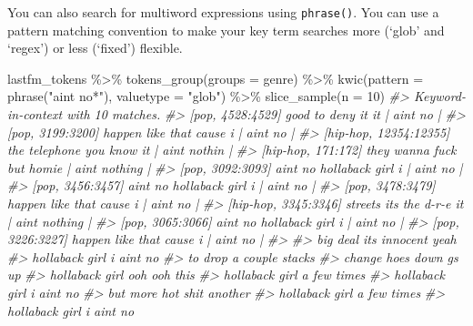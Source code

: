 \documentclass[
]{article}
\newenvironment{Shaded}{\begin{snugshade}}{\end{snugshade}}
\newcommand{\AttributeTok}[1]{\textcolor[rgb]{0.77,0.63,0.00}{#1}}
\newcommand{\CommentTok}[1]{\textcolor[rgb]{0.56,0.35,0.01}{\textit{#1}}}
\newcommand{\DecValTok}[1]{\textcolor[rgb]{0.00,0.00,0.81}{#1}}
\newcommand{\FunctionTok}[1]{\textcolor[rgb]{0.00,0.00,0.00}{#1}}
\newcommand{\NormalTok}[1]{#1}
\newcommand{\SpecialCharTok}[1]{\textcolor[rgb]{0.00,0.00,0.00}{#1}}
\newcommand{\StringTok}[1]{\textcolor[rgb]{0.31,0.60,0.02}{#1}}
\begin{document}
You can also search for multiword expressions using \texttt{phrase()}. You can use a pattern matching convention to make your key term searches more (`glob' and `regex') or less (`fixed') flexible.

\begin{Shaded}
\begin{Highlighting}[]
\NormalTok{lastfm\_tokens }\SpecialCharTok{\%\textgreater{}\%}
    \FunctionTok{tokens\_group}\NormalTok{(}\AttributeTok{groups =}\NormalTok{ genre) }\SpecialCharTok{\%\textgreater{}\%}
    \FunctionTok{kwic}\NormalTok{(}\AttributeTok{pattern =} \FunctionTok{phrase}\NormalTok{(}\StringTok{"ain\textquotesingle{}t no*"}\NormalTok{), }\AttributeTok{valuetype =} \StringTok{"glob"}\NormalTok{) }\SpecialCharTok{\%\textgreater{}\%}
    \FunctionTok{slice\_sample}\NormalTok{(}\AttributeTok{n =} \DecValTok{10}\NormalTok{)}
\CommentTok{\#\textgreater{} Keyword{-}in{-}context with 10 matches.                                                                   }
\CommentTok{\#\textgreater{}        [pop, 4528:4529]        good to deny it it |   ain\textquotesingle{}t no    |}
\CommentTok{\#\textgreater{}        [pop, 3199:3200]  happen like that cause i |   ain\textquotesingle{}t no    |}
\CommentTok{\#\textgreater{}  [hip{-}hop, 12354:12355] the telephone you know it | ain\textquotesingle{}t nothin  |}
\CommentTok{\#\textgreater{}      [hip{-}hop, 171:172] they wanna fuck but homie | ain\textquotesingle{}t nothing |}
\CommentTok{\#\textgreater{}        [pop, 3092:3093] ain\textquotesingle{}t no hollaback girl i |   ain\textquotesingle{}t no    |}
\CommentTok{\#\textgreater{}        [pop, 3456:3457] ain\textquotesingle{}t no hollaback girl i |   ain\textquotesingle{}t no    |}
\CommentTok{\#\textgreater{}        [pop, 3478:3479]  happen like that cause i |   ain\textquotesingle{}t no    |}
\CommentTok{\#\textgreater{}    [hip{-}hop, 3345:3346] streets it\textquotesingle{}s the d{-}r{-}e it | ain\textquotesingle{}t nothing |}
\CommentTok{\#\textgreater{}        [pop, 3065:3066] ain\textquotesingle{}t no hollaback girl i |   ain\textquotesingle{}t no    |}
\CommentTok{\#\textgreater{}        [pop, 3226:3227]  happen like that cause i |   ain\textquotesingle{}t no    |}
\CommentTok{\#\textgreater{}                             }
\CommentTok{\#\textgreater{}  big deal it\textquotesingle{}s innocent yeah}
\CommentTok{\#\textgreater{}  hollaback girl i ain\textquotesingle{}t no  }
\CommentTok{\#\textgreater{}  to drop a couple stacks    }
\CommentTok{\#\textgreater{}  change hoes down g\textquotesingle{}s up    }
\CommentTok{\#\textgreater{}  hollaback girl ooh ooh this}
\CommentTok{\#\textgreater{}  hollaback girl a few times }
\CommentTok{\#\textgreater{}  hollaback girl i ain\textquotesingle{}t no  }
\CommentTok{\#\textgreater{}  but more hot shit another  }
\CommentTok{\#\textgreater{}  hollaback girl a few times }
\CommentTok{\#\textgreater{}  hollaback girl i ain\textquotesingle{}t no}
\end{Highlighting}
\end{Shaded}
\end{document}
